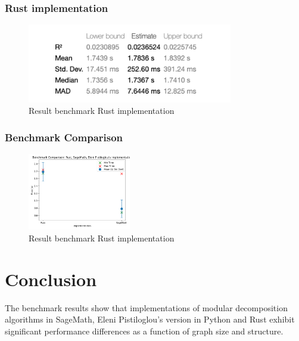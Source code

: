 \subsubsection*{Rust implementation}
\begin{figure}[!h]
    \centering
    \includegraphics[width=0.80\textwidth]{images/benchmark/graph_1000_100206/benchmark_graph_1000_100206_rust}
    \caption{Result benchmark Rust implementation}
    \label{fig:benchmark-graph-1000-100206-rust}
\end{figure}

\subsubsection*{Benchmark Comparison}
\begin{figure}[!h]
    \centering
    \includegraphics[width=0.40\textwidth]{images/benchmark/graph_1000_100206/benchmark_comparison_graph_1000_100206}
    \caption{Result benchmark Rust implementation}
    \label{fig:benchmark-comparison-graph-1000-100206}
\end{figure}


\newpage

\section{Conclusion}\label{sec:conclusion}

The benchmark results show that implementations of modular decomposition algorithms in SageMath, Eleni Pistiloglou's version in Python and Rust exhibit significant performance differences as a function of graph size and structure.

